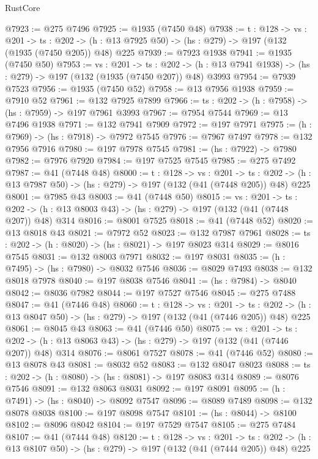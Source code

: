 \begin{lexlean}{RustCore}
\begin{coremodule}
@7923 := @275 @7496
@7925 := @1935 (@7450 @48)
@7938 := {t : @128} ->
  {vs : @201} ->
  {ts : @202} -> (h : @13 @7925 @50) -> (hs : @279) -> @197 (@132 (@1935 (@7450 @205)) @48) @225
@7939 := @7923 @1938
@7941 := @1935 (@7450 @50)
@7953 := {vs : @201} ->
  {ts : @202} -> (h : @13 @7941 @1938) -> (hs : @279) -> @197 (@132 (@1935 (@7450 @207)) @48) @3993
@7954 := @7939 @7523
@7956 := @1935 (@7450 @52)
@7958 := @13 @7956 @1938
@7959 := @7910 @52
@7961 := @132 @7925 @7899
@7966 := {ts : @202} -> (h : @7958) -> (hs : @7959) -> @197 @7961 @3993
@7967 := @7954 @7544
@7969 := @13 @7496 @1938
@7971 := @132 @7941 @7909
@7972 := @197 @7971
@7975 := (h : @7969) -> (hs : @7918) -> @7972 @7545
@7976 := @7967 @7497
@7978 := @132 @7956 @7916
@7980 := @197 @7978 @7545
@7981 := (hs : @7922) -> @7980
@7982 := @7976 @7920
@7984 := @197 @7525 @7545
@7985 := @275 @7492
@7987 := @41 (@7448 @48)
@8000 := {t : @128} ->
  {vs : @201} ->
  {ts : @202} -> (h : @13 @7987 @50) -> (hs : @279) -> @197 (@132 (@41 (@7448 @205)) @48) @225
@8001 := @7985 @43
@8003 := @41 (@7448 @50)
@8015 := {vs : @201} ->
  {ts : @202} -> (h : @13 @8003 @43) -> (hs : @279) -> @197 (@132 (@41 (@7448 @207)) @48) @314
@8016 := @8001 @7525
@8018 := @41 (@7448 @52)
@8020 := @13 @8018 @43
@8021 := @7972 @52
@8023 := @132 @7987 @7961
@8028 := {ts : @202} -> (h : @8020) -> (hs : @8021) -> @197 @8023 @314
@8029 := @8016 @7545
@8031 := @132 @8003 @7971
@8032 := @197 @8031
@8035 := (h : @7495) -> (hs : @7980) -> @8032 @7546
@8036 := @8029 @7493
@8038 := @132 @8018 @7978
@8040 := @197 @8038 @7546
@8041 := (hs : @7984) -> @8040
@8042 := @8036 @7982
@8044 := @197 @7527 @7546
@8045 := @275 @7488
@8047 := @41 (@7446 @48)
@8060 := {t : @128} ->
  {vs : @201} ->
  {ts : @202} -> (h : @13 @8047 @50) -> (hs : @279) -> @197 (@132 (@41 (@7446 @205)) @48) @225
@8061 := @8045 @43
@8063 := @41 (@7446 @50)
@8075 := {vs : @201} ->
  {ts : @202} -> (h : @13 @8063 @43) -> (hs : @279) -> @197 (@132 (@41 (@7446 @207)) @48) @314
@8076 := @8061 @7527
@8078 := @41 (@7446 @52)
@8080 := @13 @8078 @43
@8081 := @8032 @52
@8083 := @132 @8047 @8023
@8088 := {ts : @202} -> (h : @8080) -> (hs : @8081) -> @197 @8083 @314
@8089 := @8076 @7546
@8091 := @132 @8063 @8031
@8092 := @197 @8091
@8095 := (h : @7491) -> (hs : @8040) -> @8092 @7547
@8096 := @8089 @7489
@8098 := @132 @8078 @8038
@8100 := @197 @8098 @7547
@8101 := (hs : @8044) -> @8100
@8102 := @8096 @8042
@8104 := @197 @7529 @7547
@8105 := @275 @7484
@8107 := @41 (@7444 @48)
@8120 := {t : @128} ->
  {vs : @201} ->
  {ts : @202} -> (h : @13 @8107 @50) -> (hs : @279) -> @197 (@132 (@41 (@7444 @205)) @48) @225

\end{coremodule}
\end{lexlean}
